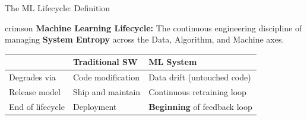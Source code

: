\documentclass[aspectratio=169, 12pt]{beamer}
\begin{document}
\begin{frame}{The ML Lifecycle: Definition}
\note{
%
%
%
%
}

\footnotesize
\begin{mlsyscard}{crimson}
\textbf{Machine Learning Lifecycle:} The continuous engineering discipline of managing
\textbf{System Entropy} across the Data, Algorithm, and Machine axes.
\end{mlsyscard}

\vspace{0.1cm}
\renewcommand{\arraystretch}{1.1}
\begin{tabular}{@{}lll@{}}
  \toprule
  & \textbf{Traditional SW} & \textbf{ML System} \\
  \midrule
  Degrades via    & Code modification      & Data drift (untouched code) \\
  Release model   & Ship and maintain      & Continuous retraining loop \\
  End of lifecycle & Deployment             & \textbf{Beginning} of feedback loop \\
  \bottomrule
\end{tabular}

\vspace{0.1cm}

\end{frame}
\end{document}
